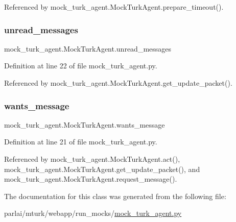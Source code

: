 Referenced by mock\+\_\+turk\+\_\+agent.\+Mock\+Turk\+Agent.\+prepare\+\_\+timeout().

\mbox{\label{classmock__turk__agent_1_1MockTurkAgent_af9f67f7197cf6c55acece21deb12b10c}} 
\subsubsection{\texorpdfstring{unread\+\_\+messages}{unread\_messages}}
{\footnotesize\ttfamily mock\+\_\+turk\+\_\+agent.\+Mock\+Turk\+Agent.\+unread\+\_\+messages}



Definition at line 22 of file mock\+\_\+turk\+\_\+agent.\+py.



Referenced by mock\+\_\+turk\+\_\+agent.\+Mock\+Turk\+Agent.\+get\+\_\+update\+\_\+packet().

\mbox{\label{classmock__turk__agent_1_1MockTurkAgent_a0ea3932c7ae85ec75406e29447ecff68}} 
\subsubsection{\texorpdfstring{wants\+\_\+message}{wants\_message}}
{\footnotesize\ttfamily mock\+\_\+turk\+\_\+agent.\+Mock\+Turk\+Agent.\+wants\+\_\+message}



Definition at line 21 of file mock\+\_\+turk\+\_\+agent.\+py.



Referenced by mock\+\_\+turk\+\_\+agent.\+Mock\+Turk\+Agent.\+act(), mock\+\_\+turk\+\_\+agent.\+Mock\+Turk\+Agent.\+get\+\_\+update\+\_\+packet(), and mock\+\_\+turk\+\_\+agent.\+Mock\+Turk\+Agent.\+request\+\_\+message().



The documentation for this class was generated from the following file\+:\begin{DoxyCompactItemize}
\item 
parlai/mturk/webapp/run\+\_\+mocks/\hyperlink{mock__turk__agent_8py}{mock\+\_\+turk\+\_\+agent.\+py}\end{DoxyCompactItemize}
